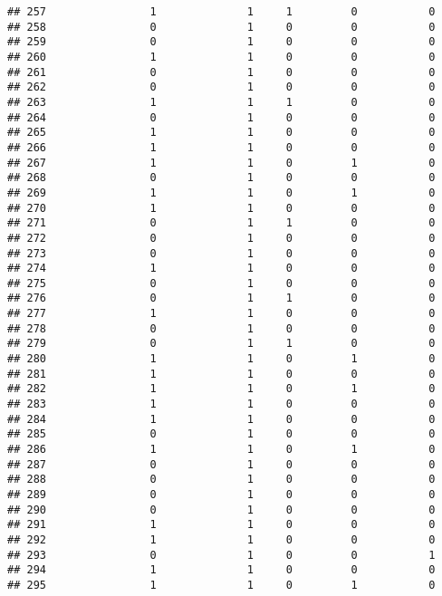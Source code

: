 \documentclass[]{article}
\begin{document}
\begin{verbatim}
## 257                1              1     1         0           0
## 258                0              1     0         0           0
## 259                0              1     0         0           0
## 260                1              1     0         0           0
## 261                0              1     0         0           0
## 262                0              1     0         0           0
## 263                1              1     1         0           0
## 264                0              1     0         0           0
## 265                1              1     0         0           0
## 266                1              1     0         0           0
## 267                1              1     0         1           0
## 268                0              1     0         0           0
## 269                1              1     0         1           0
## 270                1              1     0         0           0
## 271                0              1     1         0           0
## 272                0              1     0         0           0
## 273                0              1     0         0           0
## 274                1              1     0         0           0
## 275                0              1     0         0           0
## 276                0              1     1         0           0
## 277                1              1     0         0           0
## 278                0              1     0         0           0
## 279                0              1     1         0           0
## 280                1              1     0         1           0
## 281                1              1     0         0           0
## 282                1              1     0         1           0
## 283                1              1     0         0           0
## 284                1              1     0         0           0
## 285                0              1     0         0           0
## 286                1              1     0         1           0
## 287                0              1     0         0           0
## 288                0              1     0         0           0
## 289                0              1     0         0           0
## 290                0              1     0         0           0
## 291                1              1     0         0           0
## 292                1              1     0         0           0
## 293                0              1     0         0           1
## 294                1              1     0         0           0
## 295                1              1     0         1           0

\end{verbatim}
\end{document}
